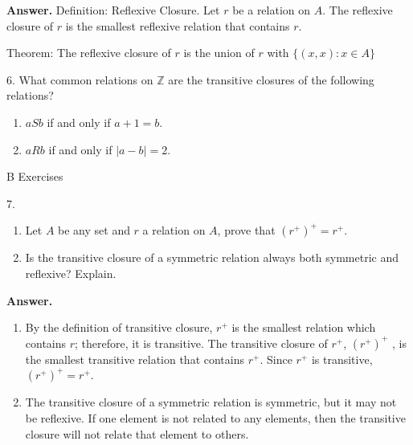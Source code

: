 \documentclass[10pt,]{book}
\theoremstyle{plain}
\theoremstyle{definition}
\theoremstyle{definition}
\theoremstyle{definition}
\theoremstyle{definition}
\begin{document}
\begin{exercisegroup}
\begin{enumerate}[label=\alph*]
\end{enumerate}
%
\par\smallskip
\par\smallskip
\noindent\textbf{Answer.}\hypertarget{answer-19}{}\quad
Definition: Reflexive Closure.  Let \(r\) be a relation on \(A\). The reflexive closure of \(r\) is the smallest reflexive relation that contains \(r\).%
\par
Theorem: The reflexive closure of \(r\) is the union of \(r\) with \(\{(x, x) : x\in A\}\) 
%
\item[6.]\hypertarget{exercise-39}{} What common relations on \(\mathbb{Z}\) are the transitive closures of the following relations?%
\par
\leavevmode%
\begin{enumerate}[label=\alph*]
\item\hypertarget{li-131}{} \(a S b\) if and only if \(a + 1 = b\).%
\item\hypertarget{li-132}{} \(a R b\) if and only if \(| a - b | = 2\).%
\end{enumerate}
%
\par\smallskip
\end{exercisegroup}
\par\smallskip\noindent
\hypertarget{exercisegroup-11}{}\typeout{************************************************}
\typeout{************************************************}
B Exercises%
\begin{exercisegroup}
\item[7.]\hypertarget{exercise-40}{}\leavevmode%
\begin{enumerate}[label=\alph*]
\item\hypertarget{li-133}{}Let \(A\) be any set and \(r\) a relation on \(A\), prove that \(\left(r^+\right)^+=r^+\).%
\item\hypertarget{li-134}{}Is the transitive closure of a symmetric relation always both symmetric and reflexive? Explain.%
\end{enumerate}
%
\par\smallskip
\par\smallskip
\noindent\textbf{Answer.}\hypertarget{answer-20}{}\quad
\leavevmode%
\begin{enumerate}[label=\alph*]
\item\hypertarget{li-135}{}  By the definition of transitive closure, \(r^+\) is the smallest relation which contains \(r\); therefore, it is transitive. The transitive closure of \(r^+\), \(\left(r^+\right)^+\) , is the smallest transitive relation that contains \(r^+\). Since \(r^+\) is transitive, \(\left(r^+\right)^+=r^+\). %
\item\hypertarget{li-136}{}  The transitive closure of a symmetric relation is symmetric, but it may not be reflexive. If one element is not related to any elements, then the transitive closure will not relate that element to others.
%
\end{enumerate}
%
\end{exercisegroup}
\end{document}
